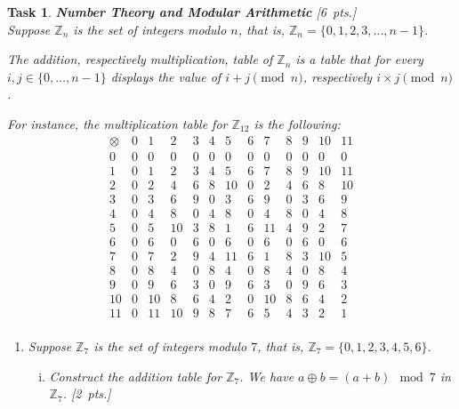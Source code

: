 \documentclass[11pt,twoside,a4paper]{article}
\theoremstyle{exercise}
\newtheorem{exercise}{Task}
\begin{document}
\begin{exercise}\textbf{Number Theory and Modular Arithmetic} [6~pts.] \\

Suppose $\mathbb{Z}_n$ is the set of integers modulo $n$, that is, $\mathbb{Z}_n=\{0, 1, 2, 3, ..., n-1\}$.

The addition, respectively multiplication, table of $\mathbb{Z}_{n}$ is a table that for every $i,j\in\{0,\ldots,n-1\}$ displays the value 
of $i + j \pmod n$, respectively  $i\times j \pmod n$.

For instance, the multiplication table for $\mathbb{Z}_{12}$ is the following:
\[
\begin{array}{c|cccccccccccc}
\otimes & 0 & 1 & 2 & 3 & 4 & 5 & 6 & 7 & 8 & 9 & 10 & 11 \\
\hline
0  & 0  & 0  & 0  & 0  & 0  & 0  & 0  & 0  & 0  & 0  & 0  & 0  \\
1  & 0  & 1  & 2  & 3  & 4  & 5  & 6  & 7  & 8  & 9  & 10 & 11 \\
2  & 0  & 2  & 4  & 6  & 8  & 10 & 0  & 2  & 4  & 6  & 8  & 10 \\
3  & 0  & 3  & 6  & 9  & 0  & 3  & 6  & 9  & 0  & 3  & 6  & 9  \\
4  & 0  & 4  & 8  & 0  & 4  & 8  & 0  & 4  & 8  & 0  & 4  & 8  \\
5  & 0  & 5  & 10 & 3  & 8  & 1  & 6  & 11 & 4  & 9  & 2  & 7  \\
6  & 0  & 6  & 0  & 6  & 0  & 6  & 0  & 6  & 0  & 6  & 0  & 6  \\
7  & 0  & 7  & 2  & 9  & 4  & 11 & 6  & 1  & 8  & 3  & 10 & 5  \\
8  & 0  & 8  & 4  & 0  & 8  & 4  & 0  & 8  & 4  & 0  & 8  & 4  \\
9  & 0  & 9  & 6  & 3  & 0  & 9  & 6  & 3  & 0  & 9  & 6  & 3  \\
10 & 0  & 10 & 8  & 6  & 4  & 2  & 0  & 10 & 8  & 6  & 4  & 2  \\
11 & 0  & 11 & 10 & 9  & 8  & 7  & 6  & 5  & 4  & 3  & 2  & 1  \\
\end{array}
\]

\begin{enumerate}
    \item Suppose $\mathbb{Z}_7$ is the set of integers modulo $7$, that is, $\mathbb{Z}_7=\{0, 1, 2, 3, 4, 5, 6\}$.

\begin{enumerate}[(i)]
\item Construct the addition table for
$\mathbb{Z}_7$. We have $a \oplus b =(a+b) \mod 7$ in $\mathbb{Z}_7$. \hfill [2~pts.]


\end{enumerate}
\end{enumerate}
\end{exercise}
\end{document}
